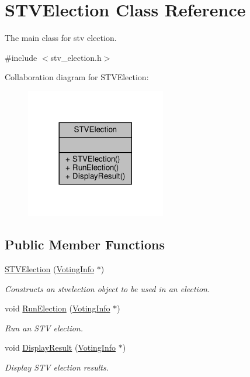 \hypertarget{classSTVElection}{}\section{S\+T\+V\+Election Class Reference}
\label{classSTVElection}


The main class for stv election.  




{\ttfamily \#include $<$stv\+\_\+election.\+h$>$}



Collaboration diagram for S\+T\+V\+Election\+:\nopagebreak
\begin{figure}[H]
\begin{center}
\leavevmode
\includegraphics[width=173pt]{classSTVElection__coll__graph}
\end{center}
\end{figure}
\subsection*{Public Member Functions}
\begin{DoxyCompactItemize}
\item 
\hyperlink{classSTVElection_a6abe30e81059242a53f0c06c29331d10}{S\+T\+V\+Election} (\hyperlink{classVotingInfo}{Voting\+Info} $\ast$)
\begin{DoxyCompactList}\small\item\em Constructs an stvelection object to be used in an election. \end{DoxyCompactList}\item 
void \hyperlink{classSTVElection_a5b72107678148a378c2c6f2ea674f344}{Run\+Election} (\hyperlink{classVotingInfo}{Voting\+Info} $\ast$)
\begin{DoxyCompactList}\small\item\em Run an S\+TV election. \end{DoxyCompactList}\item 
void \hyperlink{classSTVElection_aac94522a407b09ee5030abe88c61a1e8}{Display\+Result} (\hyperlink{classVotingInfo}{Voting\+Info} $\ast$)
\begin{DoxyCompactList}\small\item\em Display S\+TV election results. \end{DoxyCompactList}\end{DoxyCompactItemize}


